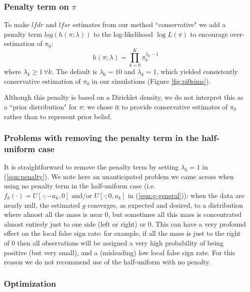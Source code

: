 \documentclass[11pt]{article}
\def\lfdr{\textit{lfdr}}
\def\lfsr{\textit{lfsr}}
\begin{document}
\subsubsection*{Penalty term on $\pi$}

To make $\lfdr$ and $\lfsr$ estimates from our method ``conservative" we add a penalty 
term $log(h(\pi;\lambda))$ to the log-likelihood $\log L(\pi)$ to encourage over-estimation of $\pi_0$:
\begin{equation} \label{eqn:penalty}
h(\pi;\lambda) = \prod_{k=0}^K \pi_k^{\lambda_k-1}
\end{equation}
where $\lambda_k \geq 1 \, \forall k$. The default is $\lambda_0=10$ and $\lambda_k=1$, which yielded
consistently conservative estimation of $\pi_0$ in our simulations (Figure \ref{fig:pi0sims}). 

Although this penalty is based on a Dirichlet density, we do not interpret this as a ``prior distribution" for $\pi$:
we chose it to provide conservative estimates of $\pi_0$ rather than to represent prior belief.

\subsubsection*{Problems with removing the penalty term in the half-uniform case}

It is straightforward to remove the penalty term by setting $\lambda_k=1$ in (\ref{eqn:penalty}).
We note here an unanticipated problem we came across when using no penalty term in the half-uniform case 
(i.e.~ $f_k(\cdot) = U[\cdot; -a_k,0] \text{ and/or } U[\cdot; 0,a_k]$ in (\ref{eqn:g-general})): when the data
are nearly null, the estimated $g$ converges, as expected and desired, to a distribution where almost all the mass is near 0, but
sometimes all this mass is concentrated almost entirely just to one side (left or right) or 0. This can have a very profound effect on the local false sign rate:
for example, if all the mass is just to the right of 0 then all observations will be assigned a very high probability of being positive (but very small),
and a (misleading) low local false sign rate. For this reason we do not recommend use of the half-uniform with no penalty.


\subsubsection*{Optimization}
\end{document}
